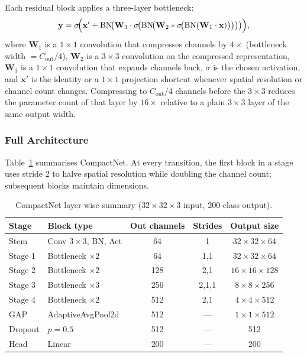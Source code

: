 \documentclass[11pt,letterpaper]{article}
\begin{document}
Each residual block applies a three-layer bottleneck:
\begin{equation}
  \mathbf{y} = \sigma\!\Bigl(
    \mathbf{x}' +
    \mathrm{BN}\!\bigl(
      \mathbf{W}_3 \cdot
      \sigma\!\bigl(
        \mathrm{BN}\!\bigl(
          \mathbf{W}_2 * \sigma\!\bigl(
            \mathrm{BN}(\mathbf{W}_1 \cdot \mathbf{x})
          \bigr)
        \bigr)
      \bigr)
    \bigr)
  \Bigr),
  \label{eq:bottleneck}
\end{equation}
where $\mathbf{W}_1$ is a $1\!\times\!1$ convolution that compresses channels by
$4\times$ (bottleneck width $= C_\text{out}/4$), $\mathbf{W}_2$ is a $3\!\times\!3$
convolution on the compressed representation, $\mathbf{W}_3$ is a $1\!\times\!1$
convolution that expands channels back, $\sigma$ is the chosen activation, and
$\mathbf{x}'$ is the identity or a $1\!\times\!1$ projection shortcut whenever spatial
resolution or channel count changes.
Compressing to $C_\text{out}/4$ channels before the $3\!\times\!3$ reduces the
parameter count of that layer by $16\times$ relative to a plain
$3\!\times\!3$ layer of the same output width.

\subsubsection{Full Architecture}

Table~\ref{tab:arch} summarises CompactNet.
At every transition, the first block in a stage uses stride 2 to halve spatial
resolution while doubling the channel count; subsequent blocks maintain dimensions.

\begin{table}[H]
  \centering
  \caption{CompactNet layer-wise summary ($32\!\times\!32\!\times\!3$ input,
           200-class output).}
  \label{tab:arch}
  \begin{tabular}{llccc}
    \toprule
    \textbf{Stage} & \textbf{Block type} &
    \textbf{Out channels} & \textbf{Strides} & \textbf{Output size} \\
    \midrule
    Stem    & Conv $3\!\times\!3$, BN, Act & 64  & 1      & $32\!\times\!32\!\times\!64$  \\
    Stage 1 & Bottleneck $\times 2$        & 64  & 1,1    & $32\!\times\!32\!\times\!64$  \\
    Stage 2 & Bottleneck $\times 2$        & 128 & 2,1    & $16\!\times\!16\!\times\!128$ \\
    Stage 3 & Bottleneck $\times 3$        & 256 & 2,1,1  & $8\!\times\!8\!\times\!256$   \\
    Stage 4 & Bottleneck $\times 2$        & 512 & 2,1    & $4\!\times\!4\!\times\!512$   \\
    GAP     & AdaptiveAvgPool2d            & 512 & ---    & $1\!\times\!1\!\times\!512$   \\
    Dropout & $p = 0.5$                    & 512 & ---    & 512                           \\
    Head    & Linear                       & 200 & ---    & 200                           \\
    \bottomrule
  \end{tabular}
\end{table}
\end{document}

